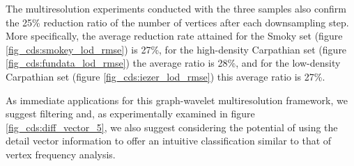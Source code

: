 \documentclass[graybox]{svmult}
\begin{document}
The multiresolution experiments conducted with the three samples also confirm the 25\% reduction ratio of the number of vertices after each downsampling step. More specifically, the average reduction rate attained for the Smoky set (figure \ref{fig_cds:smokey_lod_rmse}) is 27\%, for the high-density Carpathian set (figure \ref{fig_cds:fundata_lod_rmse}) the average ratio is 28\%, and for the low-density Carpathian set (figure \ref{fig_cds:iezer_lod_rmse})  this average ratio is 27\%.

As immediate applications for this graph-wavelet multiresolution framework, we suggest filtering \cite{CDS2017} and, as experimentally examined in figure \ref{fig_cds:diff_vector_5}, we also suggest considering the potential of using the detail vector information to offer an intuitive classification similar to that of vertex frequency analysis.






%
%


\begin{acknowledgement}

\end{acknowledgement}
%


\end{document}

